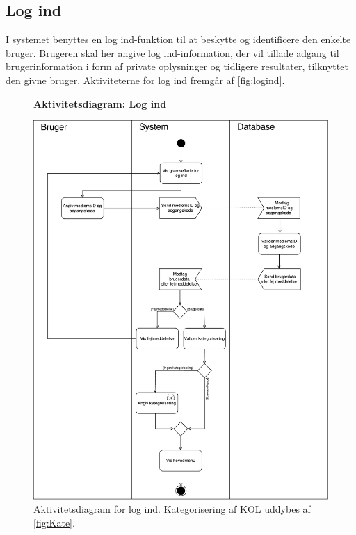 \subsection*{Log ind}
I systemet benyttes en log ind-funktion til at beskytte og identificere den enkelte bruger. Brugeren skal her angive log ind-information, der vil tillade adgang til brugerinformation i form af private oplysninger og tidligere resultater, tilknyttet den givne bruger. Aktiviteterne for log ind fremgår af \autoref{fig:logind}.    

\begin{figure} [H]
\centering
\textbf{Aktivitetsdiagram: Log ind}\par\medskip
\includegraphics[width=1\textwidth]{figures/aktivitetsdiagram/Logind}
\caption{Aktivitetsdiagram for log ind. Kategorisering af KOL uddybes af \autoref{fig:Kate}.}
\label{fig:logind}
\end{figure}

